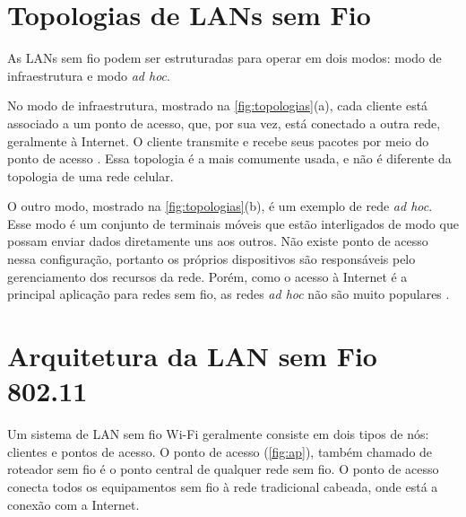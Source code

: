 \section{Topologias de LANs sem Fio}
\label{topologias-lans-sem-fio}

As LANs sem fio podem ser estruturadas para operar em dois modos: modo de infraestrutura e modo \textit{ad hoc}.

No modo de infraestrutura, mostrado na \autoref{fig:topologias}(a), cada cliente está associado a um ponto de acesso, que, por sua vez, está conectado a outra rede, geralmente à Internet. O cliente transmite e recebe seus pacotes por meio do ponto de acesso \cite{tanenbaum2011}. Essa topologia é a mais comumente usada, e não é diferente da topologia de uma rede celular.

O outro modo, mostrado na \autoref{fig:topologias}(b), é um exemplo de rede \textit{ad hoc}. Esse modo é um conjunto de terminais móveis que estão interligados de modo que possam enviar dados diretamente uns aos outros. Não existe ponto de acesso nessa configuração, portanto os próprios dispositivos são responsáveis pelo gerenciamento dos recursos da rede. Porém, como o acesso à Internet é a principal aplicação para redes sem fio, as redes \textit{ad hoc} não são muito populares \cite{tanenbaum2011}.

\begin{figure}[H]
	\centering
\end{figure}

\section{Arquitetura da LAN sem Fio 802.11}
\label{arquitetura-802-11}

Um sistema de LAN sem fio Wi-Fi geralmente consiste em dois tipos de nós: clientes e pontos de acesso. O ponto de acesso (\autoref{fig:ap}), também chamado de roteador sem fio é o ponto central de qualquer rede sem fio. O ponto de acesso conecta todos os equipamentos sem fio à rede tradicional cabeada, onde está a conexão com a Internet.

